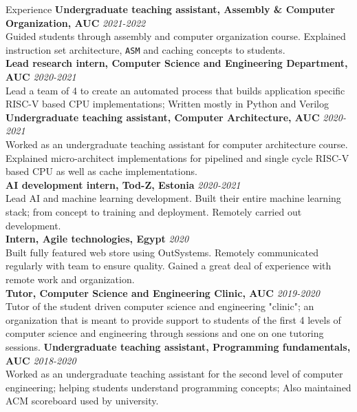 \documentclass{resume}
\begin{document}
\begin{small}
	\begin{rSection}{Experience}
		{\bf Undergraduate teaching assistant, Assembly \& Computer Organization, AUC} \hfill {\em 2021-2022} \\
		Guided students through assembly and computer organization course. Explained instruction set architecture, \verb|ASM| and caching concepts to students. \\
		{\bf Lead research intern, Computer Science and Engineering Department, AUC} \hfill {\em 2020-2021} \\
		Lead a team of 4 to create an automated process that builds application specific RISC-V based CPU implementations; Written mostly in Python and Verilog \\
		{\bf Undergraduate teaching assistant, Computer Architecture, AUC} \hfill {\em 2020-2021} \\
		Worked as an undergraduate teaching assistant for computer architecture course. Explained micro-architect implementations for pipelined and single cycle RISC-V based CPU as well as cache implementations. \\
		{\bf AI development intern, Tod-Z, Estonia} \hfill {\em 2020-2021} \\
		Lead AI and machine learning development. Built their entire machine learning stack; from concept to training and deployment. Remotely carried out development. \\
		{\bf Intern, Agile technologies, Egypt} \hfill {\em 2020} \\
		Built fully featured web store using OutSystems. Remotely communicated regularly with team to ensure quality. Gained a great deal of experience with remote work and organization. \\
		{\bf Tutor, Computer Science and Engineering Clinic, AUC} \hfill {\em 2019-2020} \\
		Tutor of the student driven computer science and engineering "clinic"; an organization that is meant to provide support to students of the first 4 levels of computer science and engineering through sessions and one on one tutoring sessions.
		{\bf Undergraduate teaching assistant, Programming fundamentals, AUC} \hfill {\em 2018-2020} \\
		Worked as an undergraduate teaching assistant for the second level of computer engineering; helping students understand programming concepts; Also maintained ACM scoreboard used by university. \\
	\end{rSection}


\end{small}
\end{document}
